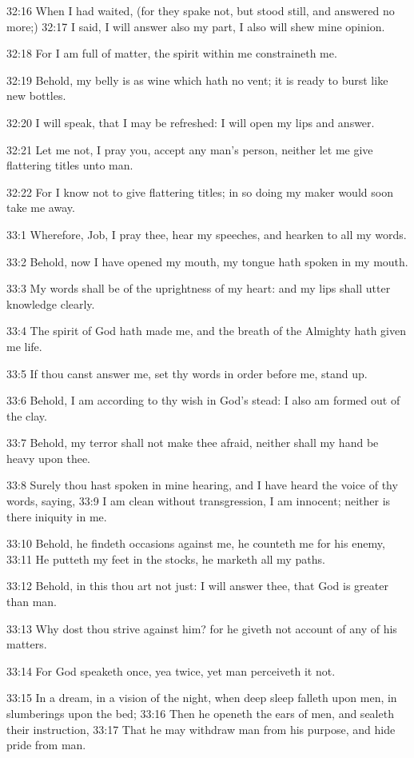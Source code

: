 32:16 When I had waited, (for they spake not, but stood still, and answered no more;) 32:17 I said, I will answer also my part, I also will shew mine opinion.

32:18 For I am full of matter, the spirit within me constraineth me.

32:19 Behold, my belly is as wine which hath no vent; it is ready to burst like new bottles.

32:20 I will speak, that I may be refreshed: I will open my lips and answer.

32:21 Let me not, I pray you, accept any man's person, neither let me give flattering titles unto man.

32:22 For I know not to give flattering titles; in so doing my maker would soon take me away.

33:1 Wherefore, Job, I pray thee, hear my speeches, and hearken to all my words.

33:2 Behold, now I have opened my mouth, my tongue hath spoken in my mouth.

33:3 My words shall be of the uprightness of my heart: and my lips shall utter knowledge clearly.

33:4 The spirit of God hath made me, and the breath of the Almighty hath given me life.

33:5 If thou canst answer me, set thy words in order before me, stand up.

33:6 Behold, I am according to thy wish in God's stead: I also am formed out of the clay.

33:7 Behold, my terror shall not make thee afraid, neither shall my hand be heavy upon thee.

33:8 Surely thou hast spoken in mine hearing, and I have heard the voice of thy words, saying, 33:9 I am clean without transgression, I am innocent; neither is there iniquity in me.

33:10 Behold, he findeth occasions against me, he counteth me for his enemy, 33:11 He putteth my feet in the stocks, he marketh all my paths.

33:12 Behold, in this thou art not just: I will answer thee, that God is greater than man.

33:13 Why dost thou strive against him? for he giveth not account of any of his matters.

33:14 For God speaketh once, yea twice, yet man perceiveth it not.

33:15 In a dream, in a vision of the night, when deep sleep falleth upon men, in slumberings upon the bed; 33:16 Then he openeth the ears of men, and sealeth their instruction, 33:17 That he may withdraw man from his purpose, and hide pride from man.

